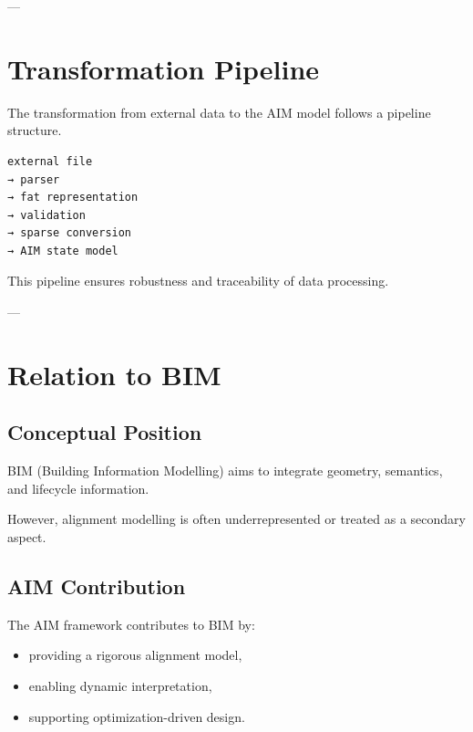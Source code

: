 ---

\section{Transformation Pipeline}

\begin{remark}
The transformation from external data to the AIM model follows a
pipeline structure.
\end{remark}

\begin{verbatim}
external file
→ parser
→ fat representation
→ validation
→ sparse conversion
→ AIM state model
\end{verbatim}

\begin{remark}
This pipeline ensures robustness and traceability of data processing.
\end{remark}

---

\section{Relation to BIM}

\subsection{Conceptual Position}

\begin{remark}
BIM (Building Information Modelling) aims to integrate geometry,
semantics, and lifecycle information.
\end{remark}

\begin{remark}
However, alignment modelling is often underrepresented or treated as a
secondary aspect.
\end{remark}

\subsection{AIM Contribution}

\begin{remark}
The AIM framework contributes to BIM by:
\begin{itemize}
\item providing a rigorous alignment model,
\item enabling dynamic interpretation,
\item supporting optimization-driven design.
\end{itemize}
\end{remark}

